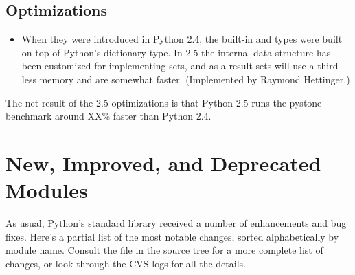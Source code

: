 \documentclass{howto}
\begin{document}
\subsection{Optimizations}

\begin{itemize}

\item When they were introduced 
in Python 2.4, the built-in  and  types
were built on top of Python's dictionary type.  
In 2.5 the internal data structure has been customized for implementing sets,
and as a result sets will use a third less memory and are somewhat faster.
(Implemented by Raymond Hettinger.)

\end{itemize}

The net result of the 2.5 optimizations is that Python 2.5 runs the
pystone benchmark around XX\% faster than Python 2.4.


\section{New, Improved, and Deprecated Modules}

As usual, Python's standard library received a number of enhancements and
bug fixes.  Here's a partial list of the most notable changes, sorted
alphabetically by module name. Consult the
 file in the source tree for a more
complete list of changes, or look through the CVS logs for all the
details.
\end{document}
